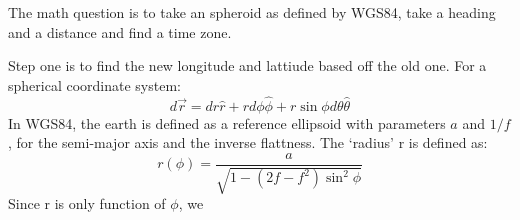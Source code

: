\documentclass[10pt,a4paper]{letter}
\author{Ian Faust}
\begin{document}
The math question is to take an spheroid as defined by WGS84, take a heading and a distance and find a time zone.

Step one is to find the new longitude and lattiude based off the old one. For a spherical coordinate system:
\[
d\vec{r} = dr\hat{r} + r d\phi\hat{\phi} + r \sin \phi d\theta\hat{\theta}
\]
In WGS84, the earth is defined as a reference ellipsoid with parameters $a$ and $1/f$, for the semi-major axis and the inverse flattness. The `radius' r is defined as:
\[
	r(\phi) = \frac{a}{\sqrt{1-(2f-f^2)\sin^2\phi}}
\]
Since r is only function of $\phi$, we 
\end{document}
